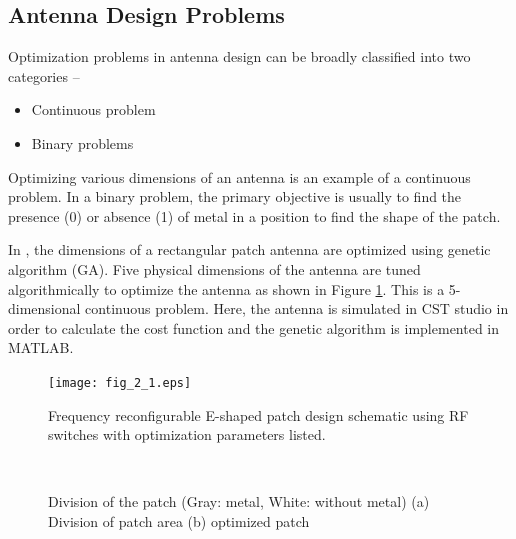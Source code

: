 \subsection{Antenna Design Problems}
Optimization problems in antenna design can be broadly classified into two categories --
\begin{itemize}
\item Continuous problem
\item Binary problems
\end{itemize}

Optimizing various dimensions of an antenna is an example of a continuous problem. In a binary problem, the primary objective is usually to find the presence (0) or absence (1) of metal in a position to find the shape of the patch.

In \cite{patch_miniaturize_ga}, the dimensions of a rectangular patch antenna are optimized using genetic algorithm (GA). Five physical dimensions of the antenna are tuned algorithmically to optimize the antenna as shown in Figure \ref{fig_2_1}. This is a 5-dimensional continuous problem. Here, the antenna is simulated in CST studio in order to calculate the cost function and the genetic algorithm is implemented in MATLAB.

\begin{figure}
  \centering
  \texttt{[image: fig\_2\_1.eps]}\\
  \caption{Frequency reconfigurable E-shaped patch design schematic using RF switches with optimization parameters listed. \cite{patch_miniaturize_ga}} \label{fig_2_1}
\end{figure}

\begin{figure}
  \centering
  ~~~~~~~~~~~~~~~~~~~~~
  \\
  \caption{Division of the patch (Gray: metal, White: without metal) (a) Division of patch area (b) optimized patch \cite{optPatch}} \label{fig_2_2}
\end{figure}

